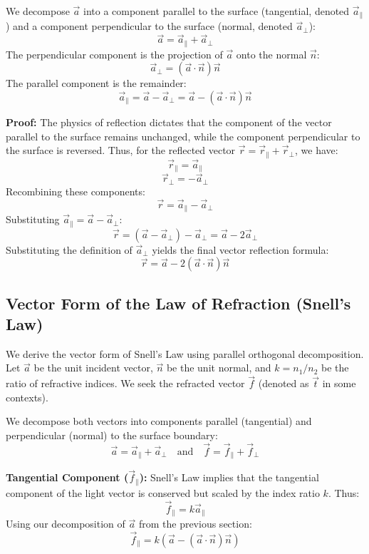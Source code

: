 \documentclass{article}
\begin{document}
We decompose $\vec{a}$ into a component parallel to the surface (tangential, denoted $\vec{a}_{\parallel}$) and a component perpendicular to the surface (normal, denoted $\vec{a}_{\perp}$):
\begin{equation}
    \vec{a} = \vec{a}_{\parallel} + \vec{a}_{\perp}
\end{equation}
The perpendicular component is the projection of $\vec{a}$ onto the normal $\vec{n}$:
\[ \vec{a}_{\perp} = (\vec{a} \cdot \vec{n}) \vec{n} \]
The parallel component is the remainder:
\[ \vec{a}_{\parallel} = \vec{a} - \vec{a}_{\perp} = \vec{a} - (\vec{a} \cdot \vec{n})\vec{n} \]

\textbf{Proof:}
The physics of reflection dictates that the component of the vector parallel to the surface remains unchanged, while the component perpendicular to the surface is reversed. Thus, for the reflected vector $\vec{r} = \vec{r}_{\parallel} + \vec{r}_{\perp}$, we have:
\[ \vec{r}_{\parallel} = \vec{a}_{\parallel} \]
\[ \vec{r}_{\perp} = - \vec{a}_{\perp} \]
Recombining these components:
\[ \vec{r} = \vec{a}_{\parallel} - \vec{a}_{\perp} \]
Substituting $\vec{a}_{\parallel} = \vec{a} - \vec{a}_{\perp}$:
\[ \vec{r} = (\vec{a} - \vec{a}_{\perp}) - \vec{a}_{\perp} = \vec{a} - 2\vec{a}_{\perp} \]
Substituting the definition of $\vec{a}_{\perp}$ yields the final vector reflection formula:
\begin{equation}
    \vec{r} = \vec{a} - 2(\vec{a} \cdot \vec{n})\vec{n}
\end{equation}

\subsection{Vector Form of the Law of Refraction (Snell's Law)}
We derive the vector form of Snell's Law using parallel orthogonal decomposition. Let $\vec{a}$ be the unit incident vector, $\vec{n}$ be the unit normal, and $k = n_1/n_2$ be the ratio of refractive indices. We seek the refracted vector $\vec{f}$ (denoted as $\vec{t}$ in some contexts).

We decompose both vectors into components parallel (tangential) and perpendicular (normal) to the surface boundary:
\[ \vec{a} = \vec{a}_{\parallel} + \vec{a}_{\perp} \quad \text{and} \quad \vec{f} = \vec{f}_{\parallel} + \vec{f}_{\perp} \]

\textbf{Tangential Component ($\vec{f}_{\parallel}$):}
Snell's Law implies that the tangential component of the light vector is conserved but scaled by the index ratio $k$. Thus:
\[ \vec{f}_{\parallel} = k \vec{a}_{\parallel} \]
Using our decomposition of $\vec{a}$ from the previous section:
\begin{equation}
    \vec{f}_{\parallel} = k (\vec{a} - (\vec{a} \cdot \vec{n})\vec{n})
\end{equation}
\end{document}
